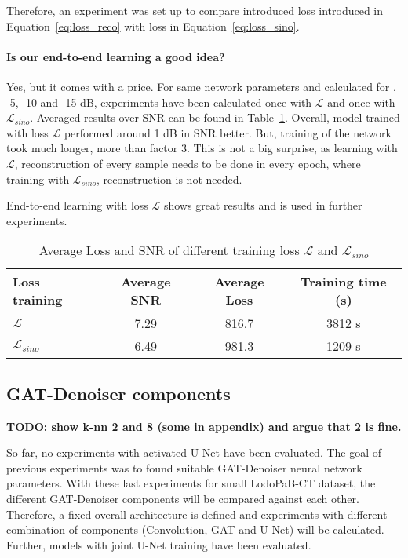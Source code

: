 Therefore, an experiment was set up to compare introduced loss introduced in Equation~\ref{eq:loss_reco}
with loss in Equation~\ref{eq:loss_sino}.


\paragraph{Is our end-to-end learning a good idea?}
Yes, but it comes with a price. 
For same network parameters and calculated for , -5, -10 and -15 dB,
experiments have been calculated once with $\mathcal{L} $ and once with $\mathcal{L}_{sino}$.
Averaged results over SNR can be found in Table~\ref{tab:loss_sino_reco}. 
Overall, model trained with loss $\mathcal{L} $ performed around 1 dB in SNR better.
But, training of the network took much longer, more than factor 3. 
This is not a big surprise, as learning with $\mathcal{L} $, reconstruction of every sample
needs to be done in every epoch, where training with $\mathcal{L}_{sino}$, reconstruction is not needed.

End-to-end learning with loss $\mathcal{L} $ shows great results and is used in further experiments.

\begin{table}[H]
  \centering
    \begin{tabular}{l|ccc}
    \toprule
    \textbf{Loss training} & \textbf{Average SNR} & \textbf{Average Loss} & \textbf{Training time (s)}  \\ 
    \midrule
    $\mathcal{L} $         &  7.29    &  816.7  & 3812 s \\ \hline
    $\mathcal{L}_{sino}$   &  6.49    &  981.3  & 1209 s \\ \hline
    \midrule
    \end{tabular}
  \caption{Average Loss and SNR of different training loss $\mathcal{L}$ and $\mathcal{L}_{sino}$}
  \label{tab:loss_sino_reco}
\end{table}


\subsection{GAT-Denoiser components}

\textbf{TODO: show k-nn 2 and 8 (some in appendix) and argue that 2 is fine.}

So far, no experiments with activated U-Net have been evaluated. 
The goal of previous experiments was to found suitable GAT-Denoiser neural network parameters.
With these last experiments for small LodoPaB-CT dataset, the different 
GAT-Denoiser components will be compared against each other.
Therefore, a fixed overall architecture is defined and experiments
with different combination of components (Convolution, GAT and U-Net) will be calculated.
Further, models with joint U-Net training have been evaluated.


